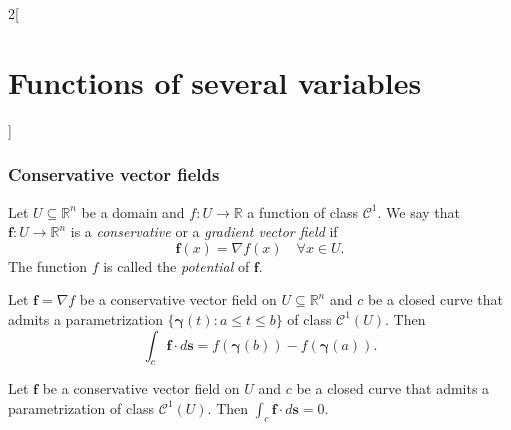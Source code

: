 \documentclass[class=article,10pt,crop=false]{standalone}
\begin{document}
\begin{multicols}{2}[\section{Functions of several variables}]
\subsubsection{Conservative vector fields}
\begin{definition}
Let $U\subseteq\mathbb{R}^n$ be a domain and $f:U\rightarrow\mathbb{R}$ a function of class $\mathcal{C}^1$. We say that $\boldsymbol{f}:U\rightarrow\mathbb{R}^n$ is a \textit{conservative} or a \textit{gradient vector field} if $$\boldsymbol{f}(x)=\nabla f(x)\quad \forall x\in U.$$ The function $f$ is called the \textit{potential} of $\boldsymbol{f}$.
\end{definition}
\begin{theorem}
Let $\boldsymbol{f}=\nabla f$ be a conservative vector field on $U\subseteq\mathbb{R}^n$ and $c$ be a closed curve that admits a parametrization $\{\boldsymbol{\gamma}(t):a\leq t\leq b\}$ of class $\mathcal{C}^1(U)$. Then $$\int_c\boldsymbol{f}\cdot d\textbf{s}=f(\boldsymbol{\gamma}(b))-f(\boldsymbol{\gamma}(a)).$$
\end{theorem}
\begin{corollary}
Let $\boldsymbol{f}$ be a conservative vector field on $U$ and $c$ be a closed curve that admits a parametrization of class $\mathcal{C}^1(U)$. Then $\displaystyle\int_c\boldsymbol{f}\cdot d\textbf{s}=0$.
\end{corollary}

\end{multicols}
\end{document}
